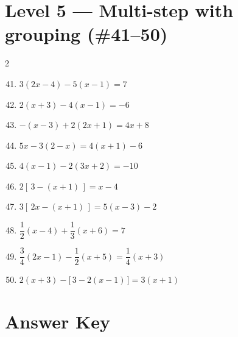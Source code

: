 \documentclass[11pt]{article}
\begin{document}
\section*{Level 5 \;—\; Multi-step with grouping (\#41--50)}
\begin{multicols}{2}
\begin{enumerate}\setcounter{enumi}{40}
  \item $3(2x - 4) - 5(x - 1) = 7$
  \item $2(x + 3) - 4(x - 1) = -6$
  \item $-(x - 3) + 2(2x + 1) = 4x + 8$
  \item $5x - 3(2 - x) = 4(x + 1) - 6$
  \item $4(x - 1) - 2(3x + 2) = -10$
  \item $2\!\left[\,3 - (x + 1)\,\right] = x - 4$
  \item $3\!\left[\,2x - (x + 1)\,\right] = 5(x - 3) - 2$
  \item $\dfrac{1}{2}(x - 4) + \dfrac{1}{3}(x + 6) = 7$
  \item $\dfrac{3}{4}(2x - 1) - \dfrac{1}{2}(x + 5) = \dfrac{1}{4}(x + 3)$
  \item $2(x + 3) - \bigl[\,3 - 2(x - 1)\,\bigr] = 3(x + 1)$
\end{enumerate}
\end{multicols}

\newpage
\section*{Answer Key}
\end{document}
